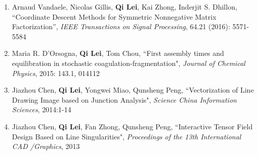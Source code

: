 \documentclass[margin, 10pt]{res} %
\begin{document}
\begin{resume}
\begin{enumerate}
	\item {Arnaud Vandaele, Nicolas Gillis, \textbf{Qi Lei},
      Kai Zhong, Inderjit S. Dhillon, ``Coordinate Descent Methods for
		Symmetric Nonnegative Matrix Factorization'', \textit{IEEE Transactions on 
Signal Processing}, 64.21 (2016): 5571-5584}	

	\item {Maria R. D'Orsogna, \textbf{Qi Lei}, Tom Chou, ``First assembly times and equilibration in stochastic coagulation-fragmentation", \textit{Journal of Chemical Physics}, 2015: 143.1, 014112}
		\item {Jiazhou Chen, \textbf{Qi Lei}, Yongwei Miao, Qunsheng Peng, ``Vectorization of Line Drawing Image based on Junction Analysis", \textit{Science China Information Sciences}, 2014:1-14}
	\item {Jiazhou Chen, \textbf{Qi Lei}, Fan Zhong, Qunsheng Peng, ``Interactive Tensor Field Design Based on Line Singularities", \textit{Proceedings of the 13th International CAD /Graphics}, 2013}
\end{enumerate}




\end{resume}
\end{document}
